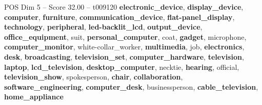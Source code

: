 \begin{textsample}{POS Dim 5 – Score 32.00 – t009120}  \label{ex:f5_pos_016}
\textbf{electronic\_device}, \textbf{display\_device}, \textbf{computer}, \textbf{furniture}, \textbf{communication\_device}, \textbf{flat-panel\_display}, \textbf{technology}, \textbf{peripheral}, \textbf{led-backlit\_lcd}, \textbf{output\_device}, \textbf{office\_equipment}, suit, \textbf{personal\_computer}, coat, \textbf{gadget}, microphone, \textbf{computer\_monitor}, white-collar\_worker, \textbf{multimedia}, job, \textbf{electronics}, \textbf{desk}, \textbf{broadcasting}, \textbf{television\_set}, \textbf{computer\_hardware}, \textbf{television}, \textbf{laptop}, \textbf{lcd\_television}, \textbf{desktop\_computer}, necktie, \textbf{hearing}, official, \textbf{television\_show}, spokesperson, \textbf{chair}, \textbf{collaboration}, \textbf{software\_engineering}, \textbf{computer\_desk}, businessperson, \textbf{cable\_television}, \textbf{home\_appliance}

\end{textsample}
